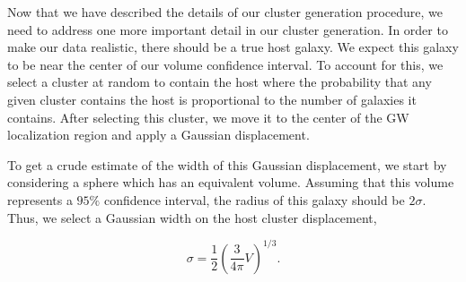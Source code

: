 Now that we have described the details of our cluster generation procedure, we need to address one more important detail in our cluster generation. In order to make our data realistic, there should be a true host galaxy. We expect this galaxy to be near the center of our volume confidence interval. To account for this, we select a cluster at random to contain the host where the probability that any given cluster contains the host is proportional to the number of galaxies it contains. After selecting this cluster, we move it to the center of the GW localization region and apply a Gaussian displacement.

To get a crude estimate of the width of this Gaussian displacement, we start by considering a sphere which has an equivalent volume. Assuming that this volume represents a $95\%$ confidence interval, the radius of this galaxy should be $2\sigma$. Thus, we select a Gaussian width on the host cluster displacement,

\begin{equation}
  \sigma = \frac{1}{2}\left(\frac{3}{4\pi} V\right)^{1/3}.
\end{equation}
